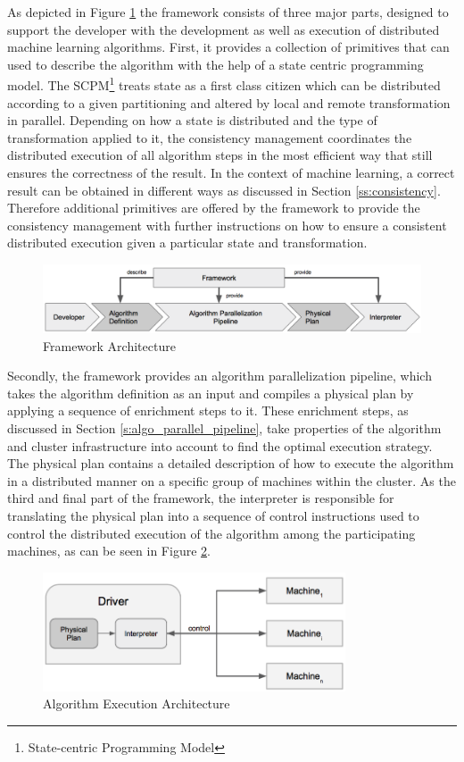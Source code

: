 As depicted in Figure \ref{fig:framework_architecture} the framework consists of three major parts, designed to support the developer with the development as well as execution of distributed machine learning algorithms.
First, it provides a collection of primitives that can used to describe the algorithm with the help of a state centric programming model.
The SCPM\footnote{State-centric Programming Model} treats state as a first class citizen which can be distributed according to a given partitioning and altered by local and remote transformation in parallel.
Depending on how a state is distributed and the type of transformation applied to it, the consistency management coordinates the distributed execution of all algorithm steps in the most efficient way that still ensures the correctness of the result.
In the context of machine learning, a correct result can be obtained in different ways as discussed in Section \ref{ss:consistency}.
Therefore additional primitives are offered by the framework to provide the consistency management with further instructions on how to ensure a consistent distributed execution given a particular state and transformation.
\begin{figure}[ht]
\centering
\includegraphics[width=1.0\textwidth]{img/framework_architecture.png}
\caption{Framework Architecture}
\label{fig:framework_architecture}
\end{figure}
Secondly, the framework provides an algorithm parallelization pipeline, which takes the algorithm definition as an input and compiles a physical plan by applying a sequence of enrichment steps to it.
These enrichment steps, as discussed in Section \ref{s:algo_parallel_pipeline}, take properties of the algorithm and cluster infrastructure into account to find the optimal execution strategy.
The physical plan contains a detailed description of how to execute the algorithm in a distributed manner on a specific group of machines within the cluster.
As the third and final part of the framework, the interpreter is responsible for translating the physical plan into a sequence of control instructions used to control the distributed execution of the algorithm among the participating machines, as can be seen in Figure \ref{fig:framework_driver}.
\begin{figure}[ht]
\centering
\includegraphics[width=0.8\textwidth]{img/framework_driver.png}
\caption{Algorithm Execution Architecture}
\label{fig:framework_driver}
\end{figure}
